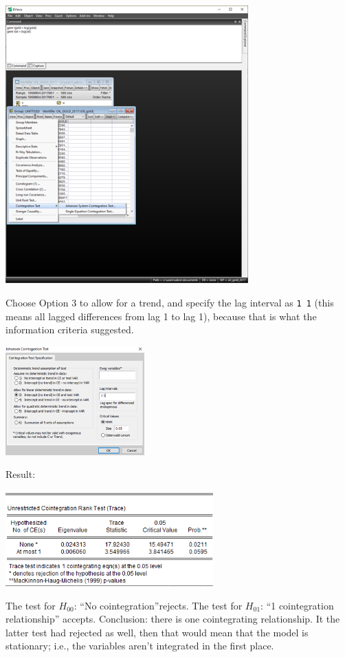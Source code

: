 \documentclass[11pt, a4paper]{article}
\begin{document}
\begin{enumerate}
\begin{enumerate}
\begin{center}
\includegraphics[width=0.7\textwidth]{johanseneviews5}
\end{center}
Choose Option 3 to allow for a trend, and specify the lag interval as \texttt{1 1} (this means all lagged differences from lag 1 to lag 1), because that is what the information criteria suggested.
\begin{center}
\includegraphics[width=0.4\textwidth]{johanseneviews6}
\end{center}
Result:
\begin{center}
\includegraphics[width=0.6\textwidth]{johansen}
\end{center}
The test for $H_{00}$: ``No cointegration''rejects. The test for $H_{01}$: ``1 cointegration relationship'' accepts. Conclusion: there is one cointegrating relationship. It the latter test had rejected as well, then that would mean that the model is stationary; i.e., the variables aren't integrated in the first place.\newpage

\end{enumerate}
\end{enumerate}
\end{document}
